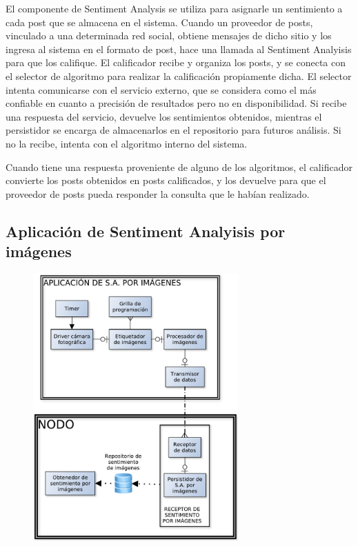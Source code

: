 El componente de Sentiment Analysis se utiliza para asignarle un sentimiento a cada post que se almacena en el sistema. Cuando un proveedor de posts, vinculado a una determinada red social, obtiene mensajes de dicho sitio y los ingresa al sistema en el formato de post, hace una llamada al Sentiment Analyisis para que los califique. El calificador recibe y organiza los posts, y se conecta con el selector de algoritmo para realizar la calificación propiamente dicha. El selector intenta comunicarse con el servicio externo, que se considera como el más confiable en cuanto a precisión de resultados pero no en disponibilidad. Si recibe una respuesta del servicio, devuelve los sentimientos obtenidos, mientras el persistidor se encarga de almacenarlos en el repositorio para futuros análisis. Si no la recibe, intenta con el algoritmo interno del sistema.

Cuando tiene una respuesta proveniente de alguno de los algoritmos, el calificador convierte los posts obtenidos en posts calificados, y los devuelve para que el proveedor de posts pueda responder la consulta que le habían realizado.


\subsection{Aplicación de Sentiment Analyisis por imágenes}

\begin{figure}[H]
\centering
\includegraphics[width=0.7\textwidth]{graph/smarttv.pdf}
\end{figure}

